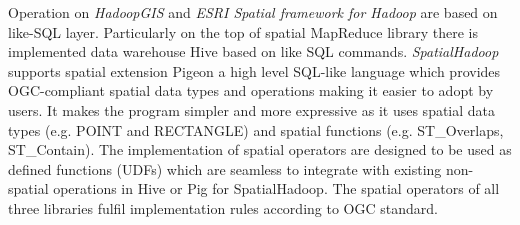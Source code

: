 \documentclass[a4paper,12pt,oneside]{report}
\begin{document}
	Operation on \textit{HadoopGIS} and \textit{ESRI Spatial framework  for Hadoop }
	 are based on like-SQL layer. 
	Particularly on the top of spatial MapReduce library there is implemented  data
	warehouse Hive based on  like SQL commands.
	\textit{SpatialHadoop} supports spatial extension Pigeon a high level SQL-like
	language which  provides OGC-compliant 
	spatial data types and operations making it easier to adopt by users. It makes
	the program simpler and more expressive 
	as it uses spatial data types (e.g. POINT and RECTANGLE) and spatial functions
	(e.g. ST\_Overlaps, ST\_Contain). 
	The implementation of spatial operators are designed to be used as defined
	functions (UDFs) which are seamless to integrate with existing  non-spatial
	operations in Hive or Pig for SpatialHadoop. The spatial operators of all three
	libraries fulfil implementation rules according to OGC standard.
	
	
	
\end{document}
